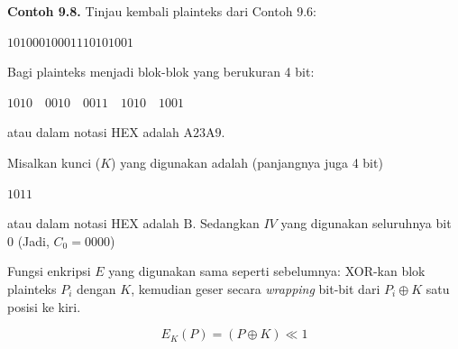 \documentclass{article}
\begin{document}

\textbf{Contoh 9.8.} Tinjau kembali plainteks dari Contoh 9.6:

\begin{center}
$10100010001110101001$
\end{center}

Bagi plainteks menjadi blok-blok yang berukuran 4 bit:

\begin{center}
$1010 \quad 0010 \quad 0011 \quad 1010 \quad 1001$
\end{center}

atau dalam notasi HEX adalah $\text{A23A9}$.

Misalkan kunci ($K$) yang digunakan adalah (panjangnya juga 4 bit)

\begin{center}
$1011$
\end{center}

atau dalam notasi HEX adalah $\text{B}$. Sedangkan $IV$ yang digunakan seluruhnya bit 0 (Jadi, $C_0 = 0000$)

Fungsi enkripsi $E$ yang digunakan sama seperti sebelumnya: XOR-kan blok plainteks $P_i$ dengan $K$, kemudian geser secara \textit{wrapping} bit-bit dari $P_i \oplus K$ satu posisi ke kiri.

\[ E_K(P) = (P \oplus K) \ll 1 \]
\end{document}
